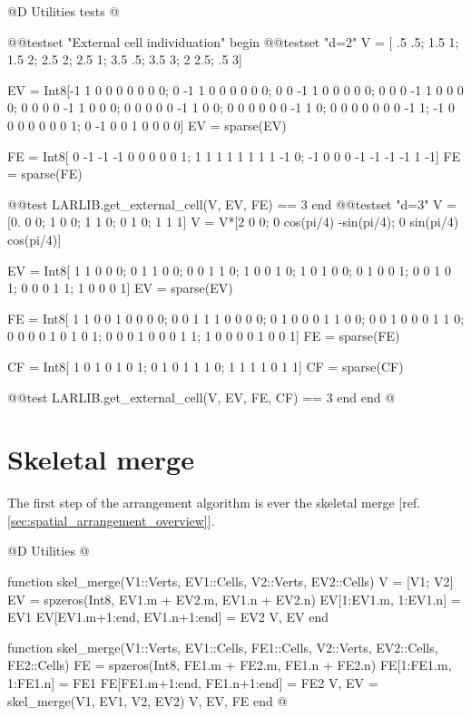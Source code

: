 @D Utilities tests
@{@@testset "External cell individuation" begin
    @@testset "d=2"
        V = [ .5 .5;  1.5   1;  1.5  2; 
            2.5  2;  2.5   1;  3.5 .5;
            3.5  3;    2 2.5;   .5  3]

        EV = Int8[-1  1  0  0  0  0  0  0  0;
                0 -1  1  0  0  0  0  0  0;
                0  0 -1  1  0  0  0  0  0;
                0  0  0 -1  1  0  0  0  0;
                0  0  0  0 -1  1  0  0  0;
                0  0  0  0  0 -1  1  0  0;
                0  0  0  0  0  0 -1  1  0;
                0  0  0  0  0  0  0 -1  1;
                -1  0  0  0  0  0  0  0  1;
                0 -1  0  0  1  0  0  0  0]
        EV = sparse(EV)
        
        FE = Int8[ 0 -1 -1 -1  0  0  0  0  0  1;
                1  1  1  1  1  1  1  1 -1  0;
                -1  0  0  0 -1 -1 -1 -1  1 -1]
        FE = sparse(FE)

        @@test LARLIB.get_external_cell(V, EV, FE) == 3
    end
    @@testset "d=3"
        V = [0. 0 0; 1 0 0; 1 1 0; 0 1 0; 1 1 1]
        V = V*[2 0 0; 0 cos(pi/4) -sin(pi/4); 0 sin(pi/4) cos(pi/4)]

        EV = Int8[
            1 1 0 0 0;
            0 1 1 0 0;
            0 0 1 1 0;
            1 0 0 1 0;
            1 0 1 0 0;
            0 1 0 0 1;
            0 0 1 0 1;
            0 0 0 1 1;
            1 0 0 0 1]
        EV = sparse(EV)
        
        FE = Int8[
            1 1 0 0 1 0 0 0 0;
            0 0 1 1 1 0 0 0 0;
            0 1 0 0 0 1 1 0 0;
            0 0 1 0 0 0 1 1 0;
            0 0 0 0 1 0 1 0 1;
            0 0 0 1 0 0 0 1 1;
            1 0 0 0 0 1 0 0 1]
        FE = sparse(FE)

        CF = Int8[
            1 0 1 0 1 0 1;
            0 1 0 1 1 1 0;
            1 1 1 1 0 1 1]
        CF = sparse(CF)

        @@test LARLIB.get_external_cell(V, EV, FE, CF) == 3
    end
end
@}



\section{Skeletal merge}
\label{sec:skel_merge}

The first step of the arrangement algorithm is ever
the skeletal merge [ref. \ref{sec:spatial_arrangement_overview}].

@D Utilities
@{function skel_merge(V1::Verts, EV1::Cells, V2::Verts, EV2::Cells)
    V = [V1; V2]
    EV = spzeros(Int8, EV1.m + EV2.m, EV1.n + EV2.n)
    EV[1:EV1.m, 1:EV1.n] = EV1
    EV[EV1.m+1:end, EV1.n+1:end] = EV2
    V, EV
end

function skel_merge(V1::Verts, EV1::Cells, FE1::Cells, V2::Verts, EV2::Cells, FE2::Cells)
    FE = spzeros(Int8, FE1.m + FE2.m, FE1.n + FE2.n)
    FE[1:FE1.m, 1:FE1.n] = FE1
    FE[FE1.m+1:end, FE1.n+1:end] = FE2
    V, EV = skel_merge(V1, EV1, V2, EV2)
    V, EV, FE
end
@}

